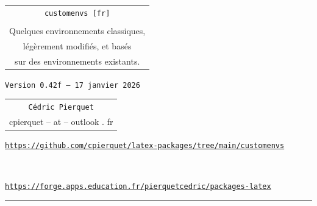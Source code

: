 \documentclass[french,11pt,a4paper]{article}
\def\TPversion{0.42f}
\def\TPdate{17 janvier 2026}
\begin{document}
\pagestyle{fancy}

\thispagestyle{empty}

\begin{center}
	\begin{minipage}{0.75\linewidth}
	\begin{tcolorbox}[colframe=yellow,colback=yellow!15]
		\begin{center}
			\renewcommand\arraystretch{1.25}
			\begin{tabular}{c}
				{\Huge \texttt{customenvs [fr]}}\\
				\\
				{\Large Quelques environnements classiques,} \\
				{\Large légèrement modifiés, et basés} \\
				{\Large sur des environnements existants.} \\
			\end{tabular}
			\renewcommand\arraystretch{1}
			
			\medskip
			
			{\small \texttt{Version \TPversion{} -- \TPdate}}
		\end{center}
	\end{tcolorbox}
\end{minipage}
\end{center}

\begin{center}
	\begin{tabular}{c}
		\texttt{Cédric Pierquet}\\
		{\ttfamily cpierquet -- at -- outlook . fr}
	\end{tabular}
\end{center}

\begin{center}
\begin{minipage}{0.85\linewidth}
	\begin{tcolorbox}[colframe=teal,colback=teal!10,halign=center,fontupper=\footnotesize]
		\texttt{\url{https://github.com/cpierquet/latex-packages/tree/main/customenvs}}
		
		~
		
		\texttt{\url{https://forge.apps.education.fr/pierquetcedric/packages-latex}}
	\end{tcolorbox}
\end{minipage}
\end{center}

\vspace*{5mm}

\hrule
\end{document}
